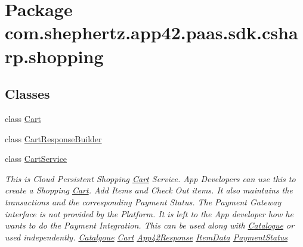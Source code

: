 \hypertarget{namespacecom_1_1shephertz_1_1app42_1_1paas_1_1sdk_1_1csharp_1_1shopping}{\section{Package com.\+shephertz.\+app42.\+paas.\+sdk.\+csharp.\+shopping}
\label{namespacecom_1_1shephertz_1_1app42_1_1paas_1_1sdk_1_1csharp_1_1shopping}
}
\subsection*{Classes}
\begin{DoxyCompactItemize}
\item 
class \hyperlink{classcom_1_1shephertz_1_1app42_1_1paas_1_1sdk_1_1csharp_1_1shopping_1_1_cart}{Cart}
\item 
class \hyperlink{classcom_1_1shephertz_1_1app42_1_1paas_1_1sdk_1_1csharp_1_1shopping_1_1_cart_response_builder}{Cart\+Response\+Builder}
\item 
class \hyperlink{classcom_1_1shephertz_1_1app42_1_1paas_1_1sdk_1_1csharp_1_1shopping_1_1_cart_service}{Cart\+Service}
\begin{DoxyCompactList}\small\item\em This is Cloud Persistent Shopping \hyperlink{classcom_1_1shephertz_1_1app42_1_1paas_1_1sdk_1_1csharp_1_1shopping_1_1_cart}{Cart} Service. App Developers can use this to create a Shopping \hyperlink{classcom_1_1shephertz_1_1app42_1_1paas_1_1sdk_1_1csharp_1_1shopping_1_1_cart}{Cart}. Add Items and Check Out items. It also maintains the transactions and the corresponding Payment Status. The Payment Gateway interface is not provided by the Platform. It is left to the App developer how he wants to do the Payment Integration. This can be used along with \hyperlink{classcom_1_1shephertz_1_1app42_1_1paas_1_1sdk_1_1csharp_1_1shopping_1_1_catalogue}{Catalogue} or used independently. \hyperlink{classcom_1_1shephertz_1_1app42_1_1paas_1_1sdk_1_1csharp_1_1shopping_1_1_cart_service}{Catalgoue} \hyperlink{classcom_1_1shephertz_1_1app42_1_1paas_1_1sdk_1_1csharp_1_1shopping_1_1_cart_service}{Cart} \hyperlink{classcom_1_1shephertz_1_1app42_1_1paas_1_1sdk_1_1csharp_1_1shopping_1_1_cart_service}{App42\+Response} \hyperlink{classcom_1_1shephertz_1_1app42_1_1paas_1_1sdk_1_1csharp_1_1shopping_1_1_cart_service}{Item\+Data} \hyperlink{classcom_1_1shephertz_1_1app42_1_1paas_1_1sdk_1_1csharp_1_1shopping_1_1_cart_service}{Payment\+Status} \end{DoxyCompactList}\item 

\end{DoxyCompactItemize}
